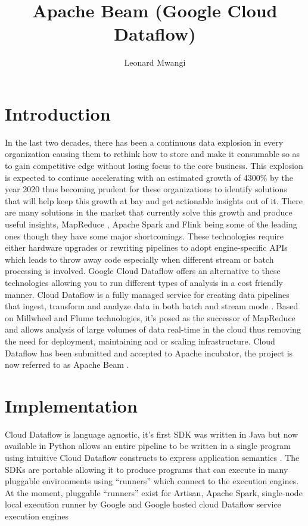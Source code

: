 \documentclass[9pt,twocolumn,twoside]{styles/osajnl}
\title{Apache Beam (Google Cloud Dataflow)}
\author[1]{Leonard Mwangi}
\affil[1]{School of Informatics and Computing, Bloomington, IN 47408,
  U.S.A.}
\affil[*]{Corresponding authors: lmwangi@iu.edu}
\begin{document}
\maketitle

\section{Introduction}

In the last two decades, there has been a continuous data explosion in
every organization causing them to rethink how to store and make it
consumable so as to gain competitive edge without losing focus to the
core business. This explosion is expected to continue accelerating
with an estimated growth of 4300\% by the year 2020 \cite{www.bigdata}
thus becoming prudent for these organizations to identify solutions
that will help keep this growth at bay and get actionable insights out
of it. There are many solutions in the market that currently solve
this growth and produce useful insights, MapReduce
\cite{www-mapreduce}, Apache Spark \cite{www-spark} and Flink
\cite{www-flink} being some of the leading ones though they have some
major shortcomings. These technologies require either hardware
upgrades \cite{www-upgrademr} or rewriting pipelines to adopt
engine-specific APIs which leads to throw away code especially when
different stream or batch processing is involved. Google Cloud
Dataflow offers an alternative to these technologies allowing you to
run different types of analysis in a cost friendly manner.  Cloud
Dataflow is a fully managed service for creating data pipelines that
ingest, transform and analyze data in both batch and stream mode
\cite{www-streammode}. Based on Millwheel \cite{millwheel} and Flume
\cite{www-flume} technologies, it’s posed as the successor of
MapReduce and allows analysis of large volumes of data real-time in
the cloud thus removing the need for deployment, maintaining and or
scaling infrastructure.  Cloud Dataflow has been submitted and
accepted to Apache incubator, the project is now referred to as Apache
Beam \cite{www-beamincubate}.

\section{Implementation}

Cloud Dataflow is language agnostic, it’s first SDK was written in
Java \cite{www-javasdk} but now available in Python
\cite{www-pythonsdk} allows an entire pipeline to be written in a
single program using intuitive Cloud Dataflow constructs to express
application semantics \cite{www-dataflowconstructs}. The SDKs are
portable allowing it to produce programs that can execute in many
pluggable environments using “runners” which connect to the execution
engines. At the moment, pluggable “runners” exist for Artisan, Apache
Spark, single-node local execution runner by Google and Google hosted
cloud Dataflow service execution engines
\end{document}
